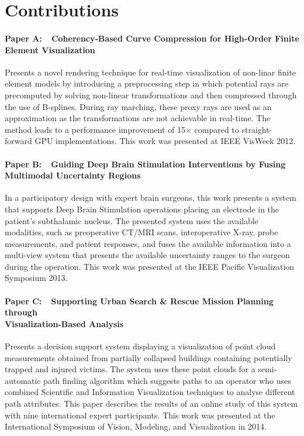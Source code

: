 \clearpg

\chapter*{Contributions}

\subsubsection{Paper A:~~Coherency-Based Curve Compression for High-Order Finite Element Visualization}
Presents a novel rendering technique for real-time visualization of non-linar finite element models by introducing a preprocessing step in which potential rays are precomputed by solving non-linear transformations and then compressed through the use of B-splines.  During ray marching, these proxy rays are used as an approximation as the transformations are not achievable in real-time.  The method leads to a performance improvement of 15$\times$ compared to straight-forward GPU implementations. This work was presented at IEEE VisWeek 2012.

\subsubsection{Paper B:~~Guiding Deep Brain Stimulation Interventions by Fusing Multimodal Uncertainty Regions}
In a participatory design with expert brain surgeons, this work presents a system that supports Deep Brain Stimulation operations placing an electrode in the patient's subthalamic nucleus.  The presented system uses the available modalities, such as preoperative CT/MRI scans, interoperative X-ray, probe measurements, and patient responses, and fuses the available information into a multi-view system that presents the available uncertainty ranges to the surgeon during the operation.  This work was presented at the IEEE Pacific Visualization Symposium 2013.

\subsubsection{Paper C:~~Supporting Urban Search \& Rescue Mission Planning through \\Visualization-Based Analysis}
Presents a decision support system displaying a  visualization of point cloud measurements obtained from partially collapsed buildings containing potentially trapped and injured victims.  The system uses these point clouds for a semi-automatic path finding algorithm which suggests paths to an operator who uses combined Scientific and Information Visualization techniques to analyse different path attributes.  This paper describes the results of an online study of this system with nine international expert participants.  This work was presented at the International Symposium of Vision, Modeling, and Visualization in 2014.

